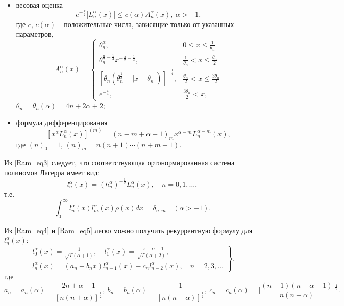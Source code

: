 \documentclass[a4paper,12pt]{article}
\begin{document}
\begin{itemize}
\item
весовая оценка \cite{Ramlib1}
\begin{equation}\label{Ram_est1}
e^{-\frac{x}{2}}|L_n^\alpha(x)|\leq c(\alpha)A_n^\alpha(x),\ \alpha>-1,
\end{equation}
где $c$, $c(\alpha)$ -- положительные числа, зависящие только от указанных параметров,
\begin{equation}\label{Ram_est2}
A_n^\alpha(x)=
\begin{cases}
  \theta_n^\alpha, & 0\leq x\leq \frac{1}{\theta_n} \\
  \theta_n^{\frac{\alpha}{2}-\frac{1}{4}}x^{-\frac{\alpha}{2}-\frac{1}{4}}, & \frac{1}{\theta_n}< x\leq \frac{\theta_n}{2} \\
  \left[\theta_n\left(\theta_n^{\frac{1}{3}}+|x-\theta_n|\right)\right]^{-\frac{1}{4}}, &  \frac{\theta_n}{2}< x\leq \frac{3\theta_n}{2} \\
  e^{-\frac{x}{4}}, & \frac{3\theta_n}{2}<x,
\end{cases}
\end{equation}
$\theta_n=\theta_n(\alpha)=4n+2\alpha+2$;

\item
формула дифференцирования \cite{Ramlib3}
\begin{equation*}
\left[x^\alpha L_n^\alpha(x)\right]^{(m)}=(n-m+\alpha+1)_m x^{\alpha-m}L_n^{\alpha-m}(x),
\end{equation*}
где $(n)_0=1$, $(n)_m=n(n+1)\cdots(n+m-1)$.
\end{itemize}

Из \eqref{Ram_eq3} следует, что соответствующая ортонормированная система полиномов Лагерра имеет вид:
\begin{equation}\label{Ram_eq5}
l_n^{\alpha}(x)=(h^{\alpha}_n)^{-\frac{1}{2}}L_n^{\alpha}(x), \quad n=0, 1, \ldots,
\end{equation}
т.е.
\begin{equation*}
\int_0^{\infty} l^{\alpha}_{n}(x) l^{\alpha}_{m}(x)\rho(x) dx = \delta_{n,m} \quad (\alpha > -1).
\end{equation*}

Из \eqref{Ram_eq4} и \eqref{Ram_eq5} легко можно получить рекуррентную формулу для $l_n^\alpha(x)$:
\begin{equation*}
\left.\begin{gathered}
l_{0}^{\alpha}(x)=\frac{1}{\sqrt{\Gamma(\alpha+1)}}, \quad l_1^{\alpha}(x)=\frac{-x+\alpha+1}{\sqrt{\Gamma(\alpha+2)}},\\
l_n^{\alpha}(x)=(a_n-b_n x)l_{n-1}^{\alpha}(x)-c_n l_{n-2}^{\alpha}(x), \quad n=2, 3, \ldots
\end{gathered}\right\},
\end{equation*}
где
\begin{equation*}
a_n=a_n(\alpha)=\frac{2n+\alpha-1}{[n(n+\alpha)]^\frac{1}{2}},\
b_n=b_n(\alpha)=\frac{1}{[n(n+\alpha)]^\frac{1}{2}},\
c_n=c_n(\alpha)=\Big[\frac{(n-1)(n+\alpha-1)}{n(n+\alpha)}\Big]^\frac{1}{2}.
\end{equation*}
\end{document}
